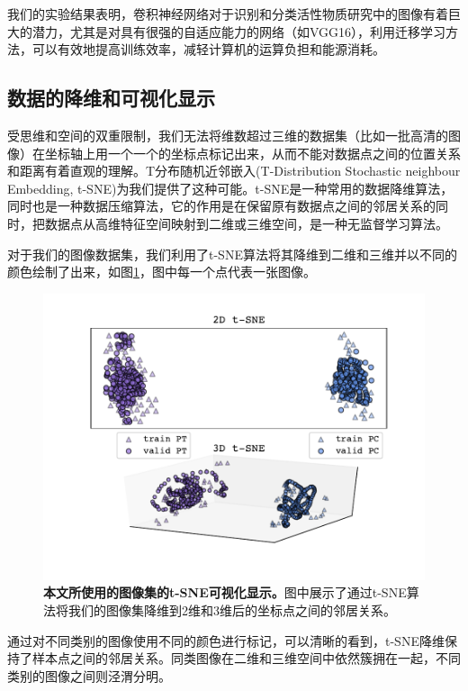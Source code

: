 我们的实验结果表明，卷积神经网络对于识别和分类活性物质研究中的图像有着巨大的潜力，尤其是对具有很强的自适应能力的网络（如VGG16），利用迁移学习方法，可以有效地提高训练效率，减轻计算机的运算负担和能源消耗。

\subsection{数据的降维和可视化显示}
受思维和空间的双重限制，我们无法将维数超过三维的数据集（比如一批高清的图像）在坐标轴上用一个一个的坐标点标记出来，从而不能对数据点之间的位置关系和距离有着直观的理解。T分布随机近邻嵌入(\textrm{T-Distribution Stochastic neighbour Embedding, t-SNE})\cite{JMLR}为我们提供了这种可能。t-SNE是一种常用的数据降维算法，同时也是一种数据压缩算法，它的作用是在保留原有数据点之间的邻居关系的同时，把数据点从高维特征空间映射到二维或三维空间，是一种无监督学习算法\cite{DL}。

对于我们的图像数据集，我们利用了t-SNE算法将其降维到二维和三维并以不同的颜色绘制了出来，如图\ref{fig:tsne}，图中每一个点代表一张图像。

\begin{figure}[H]
	\centering
	\includegraphics[width=\linewidth]{../figures/TSNE/tsne可视化.pdf}
	\caption{\textbf{本文所使用的图像集的t-SNE可视化显示。}图中展示了通过t-SNE算法将我们的图像集降维到2维和3维后的坐标点之间的邻居关系。}
	\label{fig:tsne}
\end{figure}

通过对不同类别的图像使用不同的颜色进行标记，可以清晰的看到，t-SNE降维保持了样本点之间的邻居关系。同类图像在二维和三维空间中依然簇拥在一起，不同类别的图像之间则泾渭分明。

